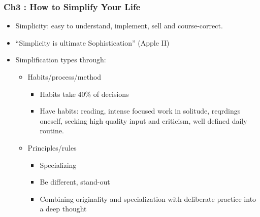 \begin{frame}[fragile]\frametitle{Ch3 : How to Simplify Your Life}

\begin{itemize}
\item Simplicity: easy to understand, implement, sell and course-correct.
\item ``Simplicity is ultimate Sophistication'' (Apple II)
\item Simplification types through:
	\begin{itemize}
	\item Habits/process/method
		\begin{itemize}
		\item Habits take 40\% of decisions
		\item Have habits: reading, intense focused work in solitude, reqrdings oneself, seeking high quality input and criticism, well defined daily routine.		
		\end{itemize}	
	\item Principles/rules
		\begin{itemize}
		\item Specializing
		\item Be different, stand-out
		\item Combining originality and specialization with deliberate practice into a deep thought
		\end{itemize}		
	\end{itemize}
\end{itemize}

\end{frame}

